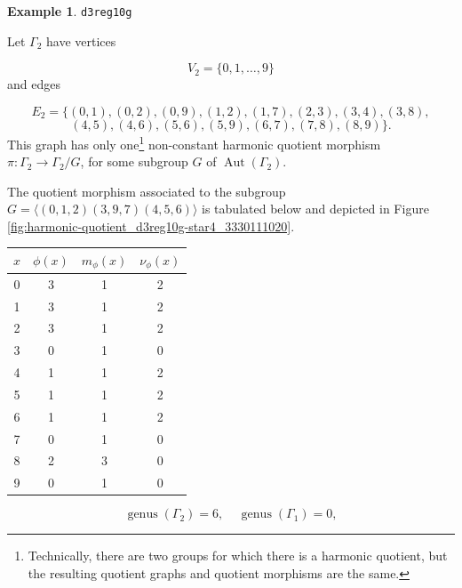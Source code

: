 \documentclass[12pt,letterpaper]{article}
\theoremstyle{definition}
\newtheorem{example}[theorem]{Example}
\DeclareMathOperator{\Aut}{Aut}
\DeclareMathOperator{\genus}{genus}
\begin{document}
\begin{example}%
\label{example:d3reg10g}
  {\tt d3reg10g}\newline
{\rm  
Let $\Gamma_2$ have vertices

\[
V_2=\{0,1,\dots,9\}
\]
and edges

\[
E_2 = \{
(0, 1), (0, 2), (0, 9), (1, 2), (1, 7), (2, 3), (3, 4), (3, 8),
\]
\[
(4, 5), (4, 6), (5, 6), (5, 9), (6, 7), (7, 8), (8, 9)
\}.
\]
This graph has only one\footnote{Technically, there are
two groups for which there is a harmonic quotient, but the
resulting quotient graphs and quotient morphisms are the same.}
non-constant harmonic quotient
morphism $\pi: \Gamma_2\to \Gamma_2/G$, for some subgroup
$G$ of $\Aut(\Gamma_2)$.

The quotient morphism associated to the subgroup
$G=\langle (0,1,2)(3,9,7)(4,5,6)\rangle$
is tabulated below and depicted in Figure \ref{fig:harmonic-quotient_d3reg10g-star4_3330111020}.

\begin{center}
\begin{tabular}{c|c|c|c}  
  $x$ & $\phi(x)$ & $m_\phi(x)$ & $\nu_\phi(x)$ \\ \hline
  0   &    3   &        1         &  2   \\ 
  1   &    3   &        1         &  2   \\ 
  2   &    3   &        1         &  2   \\ 
  3   &    0   &        1         &  0   \\ 
  4   &    1   &        1         &  2   \\ 
  5   &    1   &        1         &  2    \\ 
  6   &    1   &        1         &  2   \\ 
  7   &    0   &        1         &  0   \\
  8   &    2   &        3         &  0   \\
  9   &    0   &        1         &  0   \\ 
\end{tabular}
\end{center}

\[
  \genus(\Gamma_2) =6,\ \ \ \ \
  \genus(\Gamma_1) =0,
\]

}
\end{example}
\end{document}
